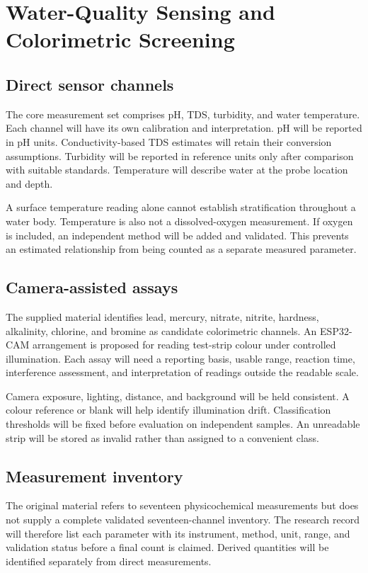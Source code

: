 \documentclass[12pt,a4paper]{article}
\newcommand{\papersection}[1]{\clearpage\section{#1}}
\begin{document}
\papersection{Water-Quality Sensing and Colorimetric Screening}
\subsection{Direct sensor channels}
The core measurement set comprises pH, TDS, turbidity, and water temperature. Each channel will have its own calibration and interpretation. pH will be reported in pH units. Conductivity-based TDS estimates will retain their conversion assumptions. Turbidity will be reported in reference units only after comparison with suitable standards. Temperature will describe water at the probe location and depth.

A surface temperature reading alone cannot establish stratification throughout a water body. Temperature is also not a dissolved-oxygen measurement. If oxygen is included, an independent method will be added and validated. This prevents an estimated relationship from being counted as a separate measured parameter.

\subsection{Camera-assisted assays}
The supplied material identifies lead, mercury, nitrate, nitrite, hardness, alkalinity, chlorine, and bromine as candidate colorimetric channels. An ESP32-CAM arrangement is proposed for reading test-strip colour under controlled illumination. Each assay will need a reporting basis, usable range, reaction time, interference assessment, and interpretation of readings outside the readable scale.

Camera exposure, lighting, distance, and background will be held consistent. A colour reference or blank will help identify illumination drift. Classification thresholds will be fixed before evaluation on independent samples. An unreadable strip will be stored as invalid rather than assigned to a convenient class.

\subsection{Measurement inventory}
The original material refers to seventeen physicochemical measurements but does not supply a complete validated seventeen-channel inventory. The research record will therefore list each parameter with its instrument, method, unit, range, and validation status before a final count is claimed. Derived quantities will be identified separately from direct measurements.
\end{document}
